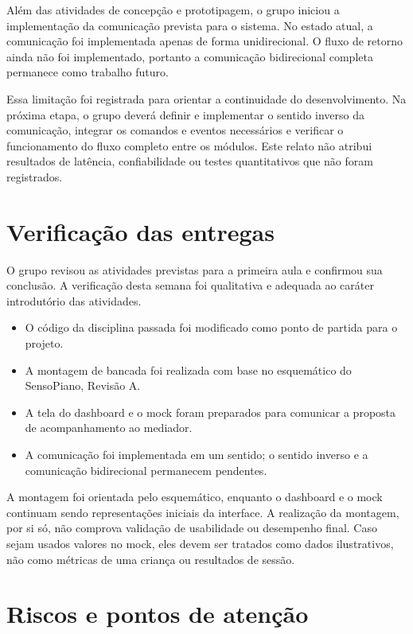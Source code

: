 \documentclass[11pt,a4paper]{article}
\begin{document}
Além das atividades de concepção e prototipagem, o grupo iniciou a implementação da comunicação prevista para o sistema. No estado atual, a comunicação foi implementada apenas de forma unidirecional. O fluxo de retorno ainda não foi implementado, portanto a comunicação bidirecional completa permanece como trabalho futuro.

Essa limitação foi registrada para orientar a continuidade do desenvolvimento. Na próxima etapa, o grupo deverá definir e implementar o sentido inverso da comunicação, integrar os comandos e eventos necessários e verificar o funcionamento do fluxo completo entre os módulos. Este relato não atribui resultados de latência, confiabilidade ou testes quantitativos que não foram registrados.

\section{Verificação das entregas}

O grupo revisou as atividades previstas para a primeira aula e confirmou sua conclusão. A verificação desta semana foi qualitativa e adequada ao caráter introdutório das atividades.

\begin{itemize}
\item O código da disciplina passada foi modificado como ponto de partida para o projeto.
\item A montagem de bancada foi realizada com base no esquemático do SensoPiano, Revisão A.
\item A tela do dashboard e o mock foram preparados para comunicar a proposta de acompanhamento ao mediador.
\item A comunicação foi implementada em um sentido; o sentido inverso e a comunicação bidirecional permanecem pendentes.
\end{itemize}

A montagem foi orientada pelo esquemático, enquanto o dashboard e o mock continuam sendo representações iniciais da interface. A realização da montagem, por si só, não comprova validação de usabilidade ou desempenho final. Caso sejam usados valores no mock, eles devem ser tratados como dados ilustrativos, não como métricas de uma criança ou resultados de sessão.

\section{Riscos e pontos de atenção}
\end{document}
